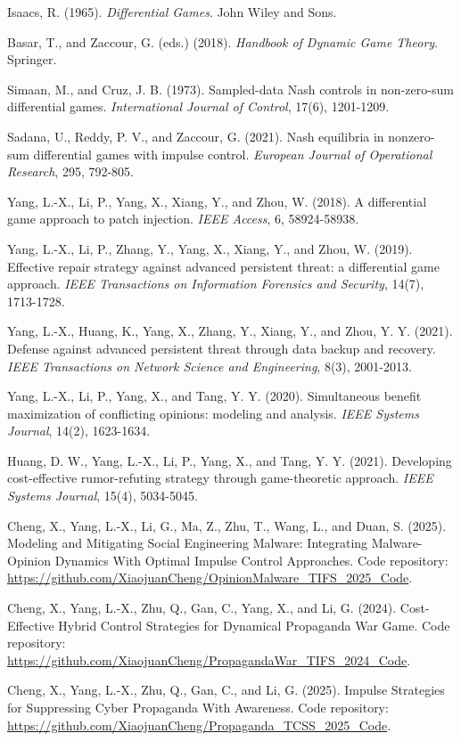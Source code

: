 \documentclass[11pt,a4paper]{article}
\begin{document}
\begin{enumerate}[label={[\arabic*]},leftmargin=2.1em]
  \item Isaacs, R. (1965). \emph{Differential Games}. John Wiley and Sons.
  \item Basar, T., and Zaccour, G. (eds.) (2018). \emph{Handbook of Dynamic Game Theory}. Springer.
  \item Simaan, M., and Cruz, J. B. (1973). Sampled-data Nash controls in non-zero-sum differential games. \emph{International Journal of Control}, 17(6), 1201-1209.
  \item Sadana, U., Reddy, P. V., and Zaccour, G. (2021). Nash equilibria in nonzero-sum differential games with impulse control. \emph{European Journal of Operational Research}, 295, 792-805.
  \item Yang, L.-X., Li, P., Yang, X., Xiang, Y., and Zhou, W. (2018). A differential game approach to patch injection. \emph{IEEE Access}, 6, 58924-58938.
  \item Yang, L.-X., Li, P., Zhang, Y., Yang, X., Xiang, Y., and Zhou, W. (2019). Effective repair strategy against advanced persistent threat: a differential game approach. \emph{IEEE Transactions on Information Forensics and Security}, 14(7), 1713-1728.
  \item Yang, L.-X., Huang, K., Yang, X., Zhang, Y., Xiang, Y., and Zhou, Y. Y. (2021). Defense against advanced persistent threat through data backup and recovery. \emph{IEEE Transactions on Network Science and Engineering}, 8(3), 2001-2013.
  \item Yang, L.-X., Li, P., Yang, X., and Tang, Y. Y. (2020). Simultaneous benefit maximization of conflicting opinions: modeling and analysis. \emph{IEEE Systems Journal}, 14(2), 1623-1634.
  \item Huang, D. W., Yang, L.-X., Li, P., Yang, X., and Tang, Y. Y. (2021). Developing cost-effective rumor-refuting strategy through game-theoretic approach. \emph{IEEE Systems Journal}, 15(4), 5034-5045.

  \item Cheng, X., Yang, L.-X., Li, G., Ma, Z., Zhu, T., Wang, L., and Duan, S. (2025). Modeling and Mitigating Social Engineering Malware: Integrating Malware-Opinion Dynamics With Optimal Impulse Control Approaches. Code repository: \url{https://github.com/XiaojuanCheng/OpinionMalware_TIFS_2025_Code}.
  \item Cheng, X., Yang, L.-X., Zhu, Q., Gan, C., Yang, X., and Li, G. (2024). Cost-Effective Hybrid Control Strategies for Dynamical Propaganda War Game. Code repository: \url{https://github.com/XiaojuanCheng/PropagandaWar_TIFS_2024_Code}.
  \item Cheng, X., Yang, L.-X., Zhu, Q., Gan, C., and Li, G. (2025). Impulse Strategies for Suppressing Cyber Propaganda With Awareness. Code repository: \url{https://github.com/XiaojuanCheng/Propaganda_TCSS_2025_Code}.
\end{enumerate}
\end{document}
